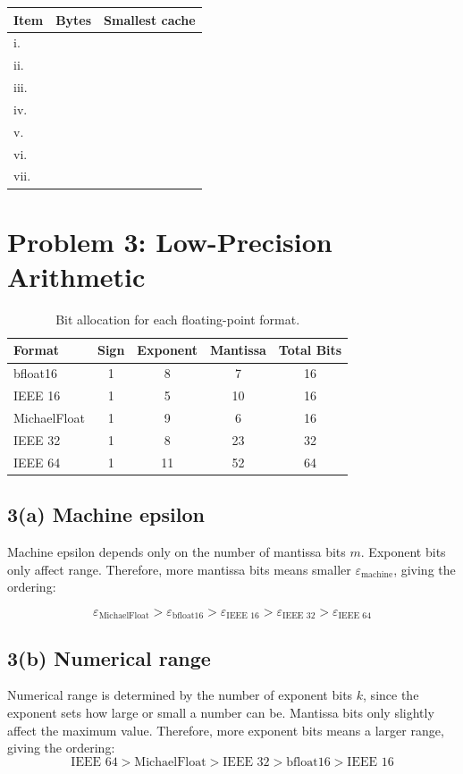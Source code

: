 \documentclass[11pt]{article}
\newcommand{\problem}[2]{\section*{Problem #1: #2}}
\newcommand{\probpart}[1]{\subsection*{#1}}
\begin{document}
\begin{center}
\begin{tabular}{@{}lll@{}}
\toprule
Item & Bytes & Smallest cache \\
\midrule
i.   &  &  \\
ii.  &  &  \\
iii. &  &  \\
iv.  &  &  \\
v.   &  &  \\
vi.  &  &  \\
vii. &  &  \\
\bottomrule
\end{tabular}
\end{center}

\newpage
\problem{3}{Low-Precision Arithmetic}


\begin{table}[h]
\centering
\begin{tabular}{lcccc}
\toprule
\textbf{Format} & \textbf{Sign} & \textbf{Exponent} & \textbf{Mantissa} & \textbf{Total Bits} \\
\midrule
bfloat16      & 1 & 8  & 7  & 16 \\
IEEE 16       & 1 & 5  & 10 & 16 \\
MichaelFloat  & 1 & 9  & 6  & 16 \\
IEEE 32       & 1 & 8  & 23 & 32 \\
IEEE 64       & 1 & 11 & 52 & 64 \\
\bottomrule
\end{tabular}
\caption{Bit allocation for each floating-point format.}
\end{table}

\probpart{3(a) Machine epsilon}


Machine epsilon depends only on the number of mantissa bits $m$. Exponent bits only affect range. Therefore, more mantissa bits means smaller $\varepsilon_{\text{machine}}$, giving the ordering:

\[
\varepsilon_{\text{MichaelFloat}} > \varepsilon_{\text{bfloat16}} > \varepsilon_{\text{IEEE 16}} > \varepsilon_{\text{IEEE 32}} > \varepsilon_{\text{IEEE 64}}
\]

\probpart{3(b) Numerical range}

Numerical range is determined by the number of exponent bits $k$, since the
exponent sets how large or small a number can be. Mantissa bits only slightly
affect the maximum value. Therefore, more exponent bits means a larger range,
giving the ordering:
\[
\text{IEEE 64} > \text{MichaelFloat} > \text{IEEE 32} > \text{bfloat16} > \text{IEEE 16}
\]
\end{document}
